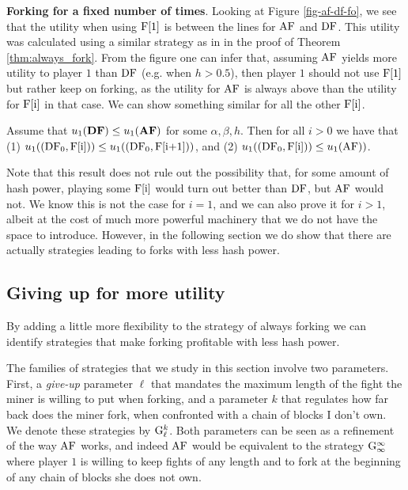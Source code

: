 \smallskip
\noindent
{}
\textbf{Forking for a fixed number of times}. Looking at Figure \ref{fig-af-df-fo}, we see that the utility when using $\text{\rm F[{1}]}$ is  between the lines for $\text{\rm AF}$ and $\text{\rm DF}$. 
This utility was calculated using a similar strategy as in in the proof of Theorem \ref{thm:always_fork}. 
From the figure one can infer that, assuming $\text{\rm AF}$ yields more utility to player $1$ than $\text{\rm DF}$ (e.g. when $h>0.5$), then player $1$ should not use $\text{\rm F[{1}]}$ but rather keep on forking, as 
the utility for $\text{\rm AF}$ is always above than the utility for $\text{\rm F[{i}]}$ in that case. %
We can show something similar for all the other $\text{\rm F[{i}]}$.
\begin{proposition}\label{prop-fork_fix}
Assume that $u_1(\text{\rm {\bf DF}}) \leq u_1(\text{\rm {\bf AF}})$ for some $\alpha,\beta,h$. Then for all $i > 0$ we have that (1) $u_1((\text{\rm DF}_0,\text{\rm F[{i}]})) \leq u_1((\text{\rm DF}_0,\text{\rm F[{i+1}]}))$, and (2) $u_1((\text{\rm DF}_0,\text{\rm F[{i}]})) \leq u_1(\text{\rm AF}))$.
\end{proposition}

Note that this result does not rule out the possibility that, for some amount of hash power, playing some $\text{\rm F[{i}]}$ would turn out better than $\text{\rm DF}$, but $\text{\rm AF}$ would not. We know 
this is not the case for $i = 1$, and we can also prove it for $i > 1$, albeit at the cost of much more powerful machinery that we do not have the space to introduce. 
However, in the following section we do show that there are actually strategies leading to forks with less hash power. 

\subsection{Giving up for more utility}

By adding a little more flexibility to the strategy of always forking we can identify strategies that make forking profitable with less hash power. 

The families of strategies that we study in this section involve two parameters. First, a \textit{give-up} parameter $\ell$ that mandates the maximum length of the fight the miner is willing to put when forking, and a parameter $k$ that regulates how far back does the miner fork, when confronted with a chain of blocks I don't own. We denote these strategies by ${\rm {G}}_\ell^k$. Both parameters can be seen as a refinement of the way $\text{\rm AF}$ works, and indeed $\text{\rm AF}$ would be equivalent to the strategy ${\rm {G}}_\infty^\infty$ where player $1$ is willing to keep fights of any length and to fork at the beginning of any chain of blocks she does not own.  

